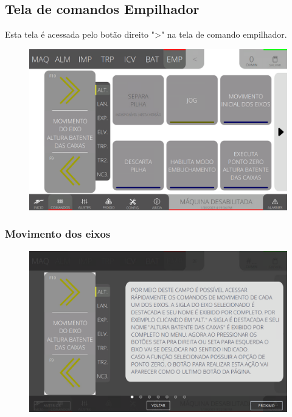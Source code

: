 
\newpage
\thispagestyle{fancy}
\vspace*{40 pt}
\subsection{Tela de comandos Empilhador} \label{sec:telaComandosEmpilhador}
Esta tela é acessada pelo botão direito "\textgreater" na tela de comando empilhador.
\vspace*{\fill}
\begin{figure}[h]
    \centering
    \includegraphics[width=480 px,height=300 px]{src/imagesICV/08-stacker/commands/Tela-Principal.png}
\end{figure}
\vspace*{\fill}

\newpage
\thispagestyle{fancy}
\vspace*{40 pt}
\subsubsection{\small{Movimento dos eixos}} \label{sec:telaComandosEmpilhadorMovimentoEixos}
\vspace*{\fill}
\begin{figure}[h]
    \centering
    \includegraphics[width=576 px,height=360 px]{src/imagesICV/08-stacker/commands/e-6.png}
\end{figure}
\vspace*{\fill}

